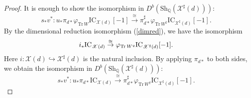 \documentclass [11pt,oneside,a4paper,mathscr]{amsart}
\theoremstyle{definition}
\newcommand{\X}{\mathscr{X}}
\newcommand{\Tr}{\mathop{\rm Tr}}
\newcommand{\ssslash}{/\!\!/}
\begin{document}
\begin{proof}
   It is enough to show the isomorphism in $D^b(\mathrm{Sh}_{\mathbb{Q}}(\X^\sharp(d)))$:
\begin{equation}\label{isopidstar}
    s_*v^*\colon u_*\pi_{d*}\varphi_{\mathrm{Tr}\,W}\mathrm{IC}_{\X(d)}[-1]\xrightarrow{\cong} \pi^\sharp_{d*}\varphi_{\mathrm{Tr}\,W^\sharp}\mathrm{IC}_{\X^\sharp(d)}[-1].
\end{equation}
By the dimensional reduction isomorphism (\ref{dimred}), 
we have the isomorphism 
\begin{align*}
    i_{\ast}\mathrm{IC}_{\X(d)}
    \stackrel{\cong}{\to} \varphi_{\Tr W^q}\mathrm{IC}_{\X^{\sharp}(d)}[-1]. 
\end{align*}
Here $i \colon \X(d) \hookrightarrow \X^{\sharp}(d)$
is the natural inclusion. 
By applying $\pi_{d\ast}$ to both sides, 
we obtain the isomorphism 
in $D^b(\mathrm{Sh}_{\mathbb{Q}}(\X^\sharp(d)))$:
\begin{equation}\label{isopprop699}
    s_*v^*\colon u_*\pi_{d*}\mathrm{IC}_{\X(d)}\xrightarrow{\cong} \pi^\sharp_{d*}\varphi_{\mathrm{Tr}\,W^q}\mathrm{IC}_{\X^\sharp(d)}[-1].
\end{equation}


\end{proof}
\end{document}
